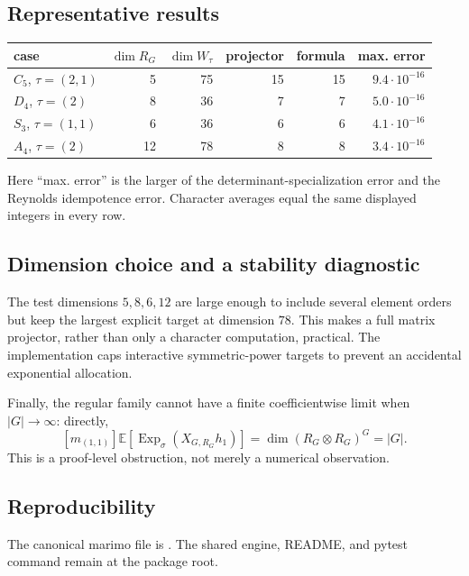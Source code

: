 \documentclass[10pt]{article}
\newcommand{\ExpS}{\operatorname{Exp}_{\sigma}}
\newcommand{\smgv}[2]{\mathbb E\!\left[\ExpS\!\left(X_{#1,#2}h_1\right)\right]}
\begin{document}
\subsection{Representative results}
\begin{center}
\small
\begin{tabular}{@{}lrrrrr@{}}
\toprule
case & $\dim R_G$ & $\dim W_\tau$ & projector & formula & max. error\\
\midrule
$C_5$, $\tau=(2,1)$ & 5 & 75 & 15 & 15 & $9.4\cdot10^{-16}$\\
$D_4$, $\tau=(2)$ & 8 & 36 & 7 & 7 & $5.0\cdot10^{-16}$\\
$S_3$, $\tau=(1,1)$ & 6 & 36 & 6 & 6 & $4.1\cdot10^{-16}$\\
$A_4$, $\tau=(2)$ & 12 & 78 & 8 & 8 & $3.4\cdot10^{-16}$\\
\bottomrule
\end{tabular}
\end{center}
Here ``max. error'' is the larger of the determinant-specialization error and
the Reynolds idempotence error.  Character averages equal the same displayed
integers in every row.

\subsection{Dimension choice and a stability diagnostic}
The test dimensions $5,8,6,12$ are large enough to include several element
orders but keep the largest explicit target at dimension $78$.  This makes a
full matrix projector, rather than only a character computation, practical.
The implementation caps interactive symmetric-power targets to prevent an
accidental exponential allocation.

Finally, the regular family cannot have a finite coefficientwise limit when
$|G|\to\infty$: directly,
\[
 [m_{(1,1)}]\smgv{G}{R_G}=\dim(R_G\otimes R_G)^G=|G|.
\]
This is a proof-level obstruction, not merely a numerical observation.

\subsection*{Reproducibility}
The canonical marimo file is
.
The shared engine, README, and pytest command remain at the package root.
\endgroup


\clearpage
\end{document}
